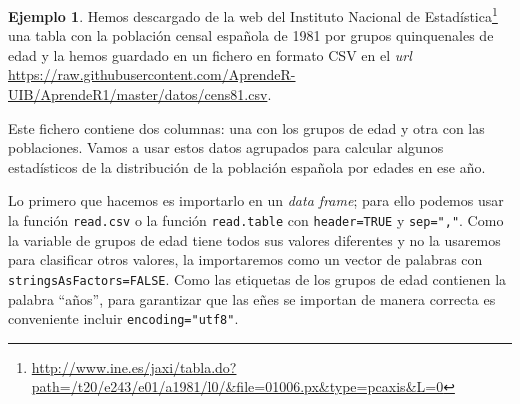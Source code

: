 \documentclass[
]{book}
\DeclareRobustCommand{\href}[2]{#2\footnote{\url{#1}}}
\theoremstyle{definition}
\theoremstyle{definition}
\newtheorem{example}{Ejemplo}[chapter]
\theoremstyle{definition}
\theoremstyle{remark}
\begin{document}
\begin{example}
\protect\hypertarget{exm:demografia}{}{\label{exm:demografia} }Hemos descargado de la \href{http://www.ine.es/jaxi/tabla.do?path=/t20/e243/e01/a1981/l0/\&file=01006.px\&type=pcaxis\&L=0}{web del Instituto Nacional de Estadística} una tabla con la población censal española de 1981 por grupos quinquenales de edad y la hemos guardado en un fichero en formato CSV en el \emph{url} \url{https://raw.githubusercontent.com/AprendeR-UIB/AprendeR1/master/datos/cens81.csv}.
\end{example}

Este fichero contiene dos columnas: una con los grupos de edad y otra con las poblaciones.
Vamos a usar estos datos agrupados para calcular algunos estadísticos de la distribución de la población española por edades en ese año.

Lo primero que hacemos es importarlo en un \emph{data frame}; para ello podemos usar la función \texttt{read.csv} o la función \texttt{read.table} con \texttt{header=TRUE} y \texttt{sep=","}. Como la variable de grupos de edad tiene todos sus valores diferentes y no la usaremos para clasificar otros valores, la importaremos como un vector de palabras con
\texttt{stringsAsFactors=FALSE}. Como las etiquetas de los grupos de edad contienen la palabra ``años'', para garantizar que las eñes se importan de manera correcta es conveniente incluir \texttt{encoding="utf8"}.
\end{document}
